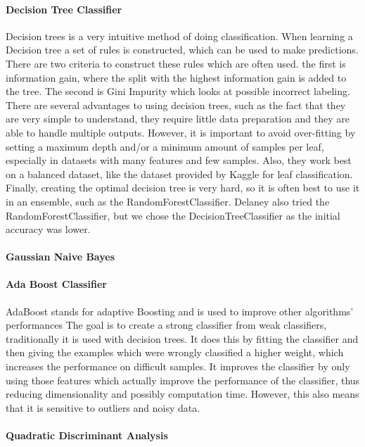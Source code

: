 \documentclass{article}
\begin{document}
	\paragraph{Decision Tree Classifier}
		Decision trees is a very intuitive method of doing classification. When learning a Decision tree a set of rules  is constructed, which can be used to make predictions. There are two criteria to construct these rules which are often used. the first is information gain, where the split with the highest information gain is added to the tree. The second is Gini Impurity which looks at possible incorrect labeling. There are several advantages to using decision trees, such as the fact that they are very simple to understand, they require little data preparation and they are able to handle multiple outputs. However, it is important to avoid over-fitting by setting a maximum depth and/or a minimum amount of samples per leaf, especially in datasets with many features and few samples. Also, they work best on a balanced dataset, like the dataset provided by Kaggle for leaf classification. Finally, creating the optimal decision tree is very hard, so it is often best to use it in an ensemble, such as the RandomForestClassifier. Delaney also tried the RandomForestClassifier, but we chose the DecisionTreeClassifier as the initial accuracy was lower.
	
	\paragraph{Gaussian Naive Bayes}
	
	\paragraph{Ada Boost Classifier}
		AdaBoost stands for adaptive Boosting and is used to improve other algorithms' performances The goal is to create a strong classifier from weak classifiers, traditionally it is used with decision trees. It does this by fitting the classifier and then giving the examples which were wrongly classified a higher weight, which increases the performance on difficult samples. It improves the classifier by only using those features which actually improve the performance of the classifier, thus reducing dimensionality and possibly computation time. However, this also means that it is sensitive to outliers and noisy data. 
	
	\paragraph{Quadratic Discriminant Analysis}
\end{document}
